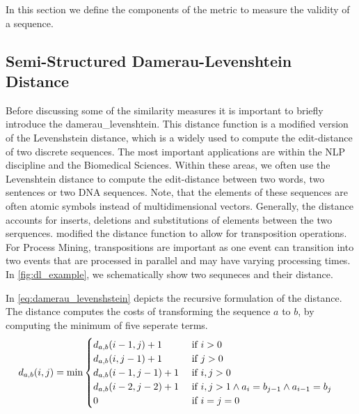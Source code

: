 \documentclass[./../../paper.tex]{subfiles}
\begin{document}
In this section we define the components of the metric to measure the validity of a sequence.

\subsection{Semi-Structured Damerau-Levenshtein Distance}
Before discussing some of the similarity measures it is important to briefly introduce the \gls{damerau_levenshtein}. This distance function is a modified version of the Levenshstein distance\autocite{levenshtein_Binarycodescapable_1965}, which is a widely used to compute the edit-distance of two discrete sequences\needscite{}. The most important applications are within the \gls{NLP} discipline and the Biomedical Sciences. Within these areas, we often use the Levenshtein distance to compute the edit-distance between two words, two sentences or two DNA sequences. Note, that the elements of these sequences are often atomic symbols instead of multidimensional vectors. Generally, the distance accounts for inserts, deletions and substitutions of elements between the two serquences.
\citeauthor{damerau_techniquecomputerdetection_1964} modified the distance function to allow for transposition operations. For Process Mining, transpositions are important as one event can transition into two events that are processed in parallel and may have varying processing times. In \autoref{fig:dl_example}, we schematically show two sequneces and their distance.


\noindent In \autoref{eq:damerau_levenshstein} depicts the recursive formulation of the distance. The distance computes the costs of transforming the sequence $a$ to $b$, by computing the minimum of five seperate terms.  
\begin{align}
    \label{eq:damerau_levenshstein}
    d_{a, b}(i, j) & =\min
    \begin{cases}
        d_{a, b}(i-1, j  )+ 1 & \text { if } i>0                                            \\
        d_{a, b}(i  , j-1)+ 1 & \text { if } j>0                                            \\
        d_{a, b}(i-1, j-1)+ 1 & \text { if } i, j>0                                         \\
        d_{a, b}(i-2, j-2)+ 1 & \text { if } i, j>1 \land a_{i}=b_{j-1} \land a_{i-1}=b_{j} \\
        0                                 & \text { if } i=j=0                                         
    \end{cases}        
\end{align}
\end{document}

